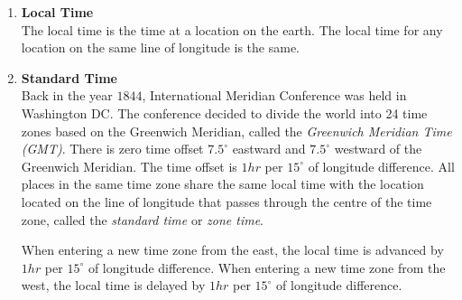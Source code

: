 \documentclass{report}
\begin{document}
\begin{multicols}{2}
    \begin{enumerate}[listparindent=1.5em]
        \item \textbf{Local Time}\\
              The local time is the time at a location on the earth. The local time for any location on the same line of longitude is the same.
        \item \textbf{Standard Time}\\
              Back in the year $1844$, International Meridian Conference was held in Washington DC. The conference decided to divide the world into 24 time zones based on the Greenwich Meridian, called the \emph{Greenwich Meridian Time (GMT)}. There is zero time offset $7.5^\circ$ eastward and $7.5^\circ$ westward of the Greenwich Meridian. The time offset is $1hr$ per $15^\circ$ of longitude difference. All places in the same time zone share the same local time with the location located on the line of longitude that passes through the centre of the time zone, called the \emph{standard time} or \emph{zone time}.

              \indent When entering a new time zone from the east, the local time is advanced by
              $1hr$ per $15^\circ$ of longitude difference. When entering a new time zone
              from the west, the local time is delayed by $1hr$ per $15^\circ$ of longitude
              difference.
    \end{enumerate}
\end{multicols}
\begin{center}
\end{center}
\end{document}
